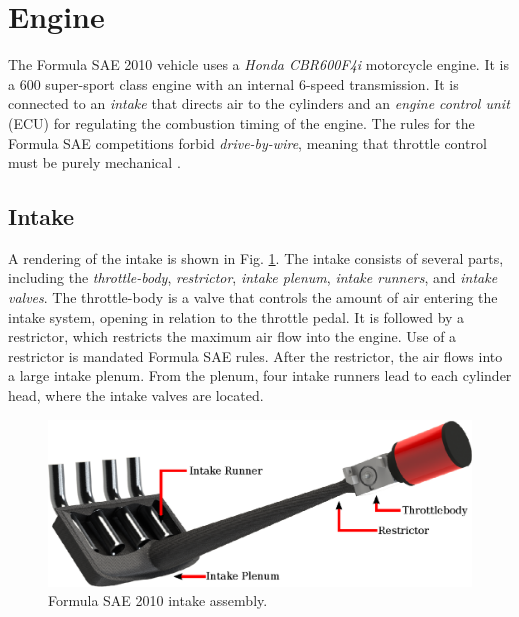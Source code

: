 \section{Engine}


The Formula SAE 2010 vehicle uses a \emph{Honda CBR600F4i} motorcycle engine. It is a \unit{600}{\centi\cubic\metre} super-sport class engine with an internal 6-speed transmission. It is connected to an \emph{intake} that directs air to the cylinders and an \emph{engine control unit} (ECU) for regulating the combustion timing of the engine. The rules for the Formula SAE competitions forbid \emph{drive-by-wire}, meaning that throttle control must be purely mechanical \cite{2010fsaerules}.

\subsection{Intake}
\label{sec:background_intake}

A rendering of the intake is shown in Fig. \ref{fig:background_intake_diagram}. The intake consists of several parts, including the \emph{throttle-body}, \emph{restrictor}, \emph{intake plenum}, \emph{intake runners}, and \emph{intake valves}. The throttle-body is a valve that controls the amount of air entering the intake system, opening in relation to the throttle pedal. It is followed by a restrictor, which restricts the maximum air flow into the engine. Use of a restrictor is mandated Formula SAE rules. After the restrictor, the air flows into a large intake plenum. From the plenum, four intake runners lead to each cylinder head, where the intake valves are located.

\begin{figure}[H]
\centering
\includegraphics[scale=1]{background/figures/intake_diagram.eps}
\caption{Formula SAE 2010 intake assembly.}
\label{fig:background_intake_diagram}
\end{figure}

